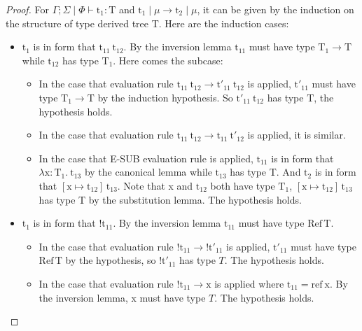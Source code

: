 \documentclass[10pt]{article}
\newcommand{\lto}{\longrightarrow}
\newcommand{\context}{\Gamma;\Sigma\mid\Phi}
\theoremstyle{definition}\newtheorem*{theorem}{Theorem}
\theoremstyle{definition}\newtheorem*{definition}{Definition}
\theoremstyle{definition}\newtheorem*{lemma}{Lemma}
\begin{document}
    \begin{proof}
        For $\context\vdash\mathrm{t_1}\colon\mathrm{T}$ and $\mathrm{t_1}\mid\mu\lto\mathrm{t_2}\mid\mu$, it can be given by the induction on the structure of type derived tree T. Here are the induction cases:
        \begin{itemize}
            \item $\mathrm{t_1}$ is in form that $\mathrm{t_{11}}\ \mathrm{t_{12}}$. By the inversion lemma $\mathrm{t_{11}}$ must have type $\mathrm{T_1}\to\mathrm{T}$ while $\mathrm{t_{12}}$ has type $\mathrm{T_1}$.
                Here comes the subcase:
                \begin{itemize}
                    \item In the case that evaluation rule $\mathrm{t_{11}}\ \mathrm{t_{12}} \lto \mathrm{t'_{11}}\ \mathrm{t_{12}}$ is applied, $\mathrm{t'_{11}}$ must have type $\mathrm{T_1}\to\mathrm{T}$ by the induction hypothesis. So $\mathrm{t'_{11}}\ \mathrm{t_{12}}$ has type $\mathrm{T}$, the hypothesis holds.
                    \item In the case that evaluation rule $\mathrm{t_{11}}\ \mathrm{t_{12}} \lto \mathrm{t_{11}}\ \mathrm{t'_{12}}$ is applied, it is similar.
                    \item In the case that E-SUB evaluation rule is applied, $\mathrm{t_{11}}$ is in form that $\lambda \mathrm{x}\colon \mathrm{T_1}.\ \mathrm{t_{13}}$ by the canonical lemma while $\mathrm{t_{13}}$ has type T.
                        And $\mathrm{t_2}$ is in form that $[\mathrm{x}\mapsto\mathrm{t_{12}}]\, \mathrm{t_{13}}$. Note that x and $\mathrm{t_{12}}$ both have type $\mathrm{T_1}$, $[\mathrm{x}\mapsto\mathrm{t_{12}}]\, \mathrm{t_{13}}$ has type T by the substitution lemma. The hypothesis holds.
                \end{itemize}
                \item $\mathrm{t_1}$ is in form that $!\mathrm{t_{11}}$. By the inversion lemma $\mathrm{t_{11}}$ must have type $\mathrm{Ref}\,\mathrm{T}$.
                    \begin{itemize}
                        \item In the case that evaluation rule $!\mathrm{t_{11}}\lto!\mathrm{t'_{11}}$ is applied, $\mathrm{t'_{11}}$ must have type $\mathrm{Ref}\,\mathrm{T}$ by the hypothesis,
                            so $!\mathrm{t'_{11}}$ has type $T$. The hypothesis holds.
                        \item In the case that evaluation rule $!\mathrm{t_{11}}\lto \mathrm{x}$ is applied where $\mathrm{t_{11}} = \mathrm{ref}\ \mathrm{x}$. By the inversion lemma, x must have type $T$. The hypothesis holds.

\end{itemize}
\end{itemize}
\end{proof}
\end{document}
